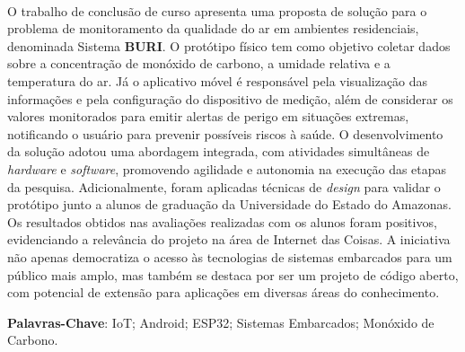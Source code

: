 \ \ \\[2cm]
O trabalho de conclusão de curso apresenta uma proposta de solução para o problema de monitoramento da qualidade do ar em ambientes residenciais, denominada 
Sistema \textbf{BURI}. O protótipo físico tem como objetivo coletar dados sobre a concentração de monóxido de carbono, a umidade relativa e a temperatura do ar. 
Já o aplicativo móvel é responsável pela visualização das informações e pela configuração do dispositivo de medição, além de considerar os valores monitorados para 
emitir alertas de perigo em situações extremas, notificando o usuário para prevenir possíveis riscos à saúde. O desenvolvimento da solução adotou uma abordagem integrada, 
com atividades simultâneas de \textit{hardware} e \textit{software}, promovendo agilidade e autonomia na execução das etapas da pesquisa. Adicionalmente, 
foram aplicadas técnicas de \textit{design} para validar o protótipo junto a alunos de graduação da Universidade do Estado do Amazonas. Os resultados obtidos nas avaliações 
realizadas com os alunos foram positivos, evidenciando a relevância do projeto na área de Internet das Coisas. A iniciativa não apenas democratiza o acesso às tecnologias 
de sistemas embarcados para um público mais amplo, mas também se destaca por ser um projeto de código aberto, com potencial de extensão para aplicações em diversas áreas do conhecimento.



\noindent \textbf{Palavras-Chave}: IoT; Android; ESP32; Sistemas Embarcados; Monóxido de Carbono.
